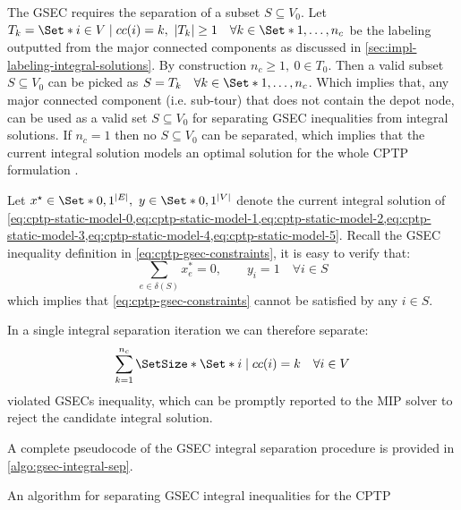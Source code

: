 The GSEC requires the separation of a subset $S \subseteq V_0$.
Let $T_k  = \Set*{i \in V \mid cc(i) = k},\ |T_k| \ge 1 \quad \forall k \in \Set*{1, \dots, n_c}$ be the labeling
outputted from the major connected components as discussed in \cref{sec:impl-labeling-integral-solutions}.
By construction $n_c \ge 1,\ 0 \in T_0$.
Then a valid subset $S \subseteq V_0$ can be picked as $S = T_k \quad \forall k \in \Set*{1, \dots, n_c}$.
Which implies that,
any major connected component (i.e. sub-tour) that does not contain the depot node,
can be used as a valid set $S \subseteq V_0$ for separating GSEC inequalities from integral solutions.
If $n_c = 1$ then no $S \subseteq V_0$ can be separated,
which implies that the current integral solution models an optimal solution for the whole CPTP formulation
.


Let $x^\star \in \Set*{0, 1}^{|E|},\ y \in \Set*{0, 1}^{|V|}$ denote the
current integral solution of
\cref{eq:cptp-static-model-0,eq:cptp-static-model-1,eq:cptp-static-model-2,eq:cptp-static-model-3,eq:cptp-static-model-4,eq:cptp-static-model-5}.
Recall the GSEC inequality definition in \cref{eq:cptp-gsec-constraints},
it is easy to verify that:
\begin{equation}
	\sum_{e \in \delta(S)} x^*_{e} = 0, \qquad y_i =  1 \quad \forall i \in S
\end{equation}
which implies that \cref{eq:cptp-gsec-constraints} cannot be satisfied by any $i \in S$.

\medskip

In a single integral separation iteration we can therefore separate:
\begin{equation}
	\sum^{n_c}_{k = 1} \SetSize*{ \Set*{ i \mid cc(i) = k \quad \forall i \in V } }
\end{equation}
violated GSECs inequality, which can be promptly reported to the MIP solver to reject the candidate integral solution.

A complete pseudocode of the GSEC integral separation procedure is provided in \cref{algo:gsec-integral-sep}.

\begin{algorithm}
	\caption{An algorithm for separating GSEC integral inequalities for the CPTP}
	\label{algo:gsec-integral-sep}
	
\end{algorithm}





